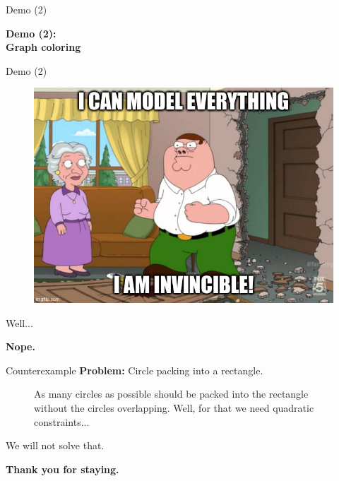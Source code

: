\documentclass[10pt]{beamer}
\newcommand{\primaryColorB}[1]{\textcolor{mpigreen}{\textbf{#1}}}
\begin{document}
\begin{frame}{Demo (2)}

\begin{center}
	\Huge \primaryColorB{Demo (2):\\ Graph coloring}
\end{center}
\end{frame}

\begin{frame}{Demo (2)}

\begin{figure}
	\centering
	\includegraphics[scale=0.4]{model_everything.jpeg}
\end{figure}
\end{frame}

\begin{frame}{Well...}

\begin{center}
	\Huge \primaryColorB{Nope.}
\end{center}
\end{frame}

\newcommand{\circleNode}[2]{\node[state, mpigreen,minimum size=1cm] (x5) at (#1,#2) {};}
\begin{frame}{Counterexample}
\primaryColorB{Problem:} Circle packing into a rectangle.
\begin{figure}
	\centering
	\circlePacking
	\caption{As many circles as possible should be packed into the rectangle  without the circles overlapping. Well, for that we need quadratic constraints...}
\end{figure}
\end{frame}


\begin{frame}{We will not solve that.}

\begin{center}
	\Huge \primaryColorB{Thank you for staying.}
\end{center}
\end{frame}
\end{document}
